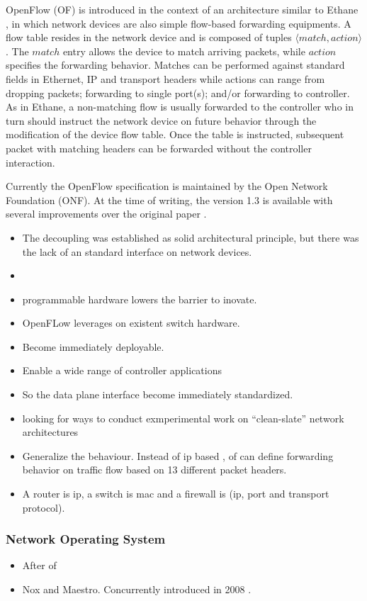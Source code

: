 \begin{itemize}
OpenFlow (OF) is introduced in the context of an architecture similar to
Ethane \cite{Casado:2007kb}, in which network devices 
are also simple flow-based forwarding equipments. A flow
table resides in the network device and is composed of tuples
$\langle match,action \rangle$. The $match$ entry allows the device to match
arriving packets, while  $action$
specifies the forwarding behavior. Matches can be performed against
standard fields in Ethernet, IP and transport headers while actions can
range from dropping packets; forwarding to single port(s); and/or forwarding to controller. As in Ethane, a non-matching flow is usually forwarded to the controller who in
turn should instruct  the network device on future behavior through
the modification of the device flow table. Once the table is instructed, 
subsequent packet with matching headers can be forwarded without
the controller interaction. 

Currently the OpenFlow specification is maintained by the Open Network
Foundation (ONF). At the time of writing, the version 1.3 \cite{of13} is available with
several improvements over the original paper \cite{openflow}. 

\begin{itemize}
\item The decoupling was established as solid architectural principle, but there was the lack of an standard interface on network devices. 
\item 
\item programmable hardware lowers the barrier to inovate. 
\item OpenFLow leverages on existent switch hardware. 
\item Become immediately deployable. 
\item  Enable a wide range of controller applications
\item So the data plane interface become immediately standardized. 
\item looking for ways to conduct exmperimental work on ``clean-slate'' network architectures 
\item Generalize the behaviour. Instead of ip based , \gls{of} can define forwarding behavior on traffic flow based on 13 different packet headers. 
\item A router is ip, a switch is mac and a firewall is (ip, port and transport protocol). 
\end{itemize}
\subsubsection{Network Operating System}
\begin{itemize}
\item After \gls{of} 
\item Nox and Maestro. Concurrently introduced in 2008 . 


\end{itemize}
\end{itemize}
